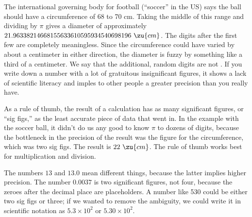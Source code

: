 The international governing body for football (``soccer'' in the US) says
the ball should have a circumference of 68 to 70 cm. Taking the middle of
this range and dividing by $\pi$ gives a diameter of approximately
$21.96338214668155633610595934540698196\ \zu{cm}$.
The digits after the first few are completely meaningless. Since the
circumference could have varied by about a centimeter in either direction,
the diameter is fuzzy by something like a third of a centimeter. We say that
the additional, random digits are not .
If you write down a number with a lot of gratuitous insignificant figures,
it shows a lack of scientific literacy and imples to other people a greater
precision than you really have.

As a rule of thumb, the result of a calculation has as many significant
figures, or ``sig figs,'' as the least accurate piece of data that went
in. In the example with the soccer ball, it didn't do us any good to know
$\pi$ to dozens of digits, because the bottleneck in the precision of the
result was the figure for the circumference, which was two sig figs.
The result is $22\ \zu{cm}$.
The rule of thumb works best for multiplication and division.

The numbers $13$ and $13.0$ mean different things, because the latter implies
higher precision. The number $0.0037$ is two significant figures, not four,
because the zeroes after the decimal place are placeholders. A number like
530 could be either two sig figs or three; if we wanted to remove the ambiguity,
we could write it in scientific notation as $5.3\times10^2$ or $5.30\times10^2$.
